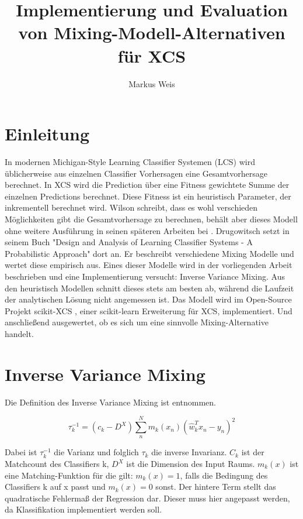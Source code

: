 \documentclass[10pt]{ocsmnar}
\begin{document}
\title{Implementierung und Evaluation von Mixing-Modell-Alternativen für XCS}


\author{Markus Weis}

\maketitle




\section{Einleitung}
In modernen Michigan-Style Learning Classifier Systemen (LCS) wird üblicherweise aus einzelnen Classifier Vorhersagen eine Gesamtvorhersage berechnet. In XCS wird die Prediction über eine Fitness gewichtete Summe der einzelnen Predictions berechnet. Diese Fitness ist ein heuristisch Parameter, der inkrementell berechnet wird. Wilson schreibt, dass es wohl verschieden Möglichkeiten gibt die Gesamtvorhersage zu berechnen, behält aber dieses Modell ohne weitere Ausführung in seinen späteren Arbeiten bei \cite{Wilson95}. 
Drugowitsch setzt in seinem Buch "Design and Analysis of Learning Classifier Systems - A Probabilistic Approach" \cite{book} dort an. Er beschreibt verschiedene Mixing Modelle und wertet diese empirisch aus. 
Eines dieser Modelle wird in der vorliegenden Arbeit beschrieben und eine Implementierung versucht: Inverse Variance Mixing. Aus den heuristisch Modellen schnitt dieses stets am besten ab, während die Laufzeit der  analytischen Lösung nicht angemessen ist. Das Modell wird im Open-Source Projekt scikit-XCS \cite{repo}, einer scikit-learn Erweiterung für XCS, implementiert. Und anschließend ausgewertet, ob es sich um eine sinnvolle Mixing-Alternative handelt.

\section{Inverse Variance Mixing}
Die Definition des Inverse Variance Mixing ist \cite{book} entnommen. 

$$ \tau_{k}^{-1} = (c_{k} - D^{X}) \sum_{n}^{N} m_{k}(x_{n}) (\hat{w}_{k}^T x_{n} - y_{n})^{2}$$

Dabei ist $\tau_{k}^{-1}$ die Varianz und folglich $\tau_{k}$ die inverse Invarianz. $C_{k}$ ist der Matchcount des Classifiers k, $D^{X}$ ist die Dimension des Input Raums. $m_{k}(x)$ ist eine Matching-Funktion für die gilt: $m_{k}(x) = 1$, falls die Bedingung des Classifiers k auf x passt und $m_{k}(x) = 0$ sonst. 
Der hintere Term stellt das quadratische Fehlermaß der Regression dar. Dieser muss hier angepasst  werden, da Klassifikation implementiert werden soll.
\end{document}
